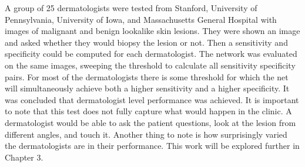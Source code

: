 A group of 25 dermatologists were tested from Stanford, University of Pennsylvania, University of Iowa, and Massachusetts General Hospital with images of malignant and benign lookalike skin lesions.  They were shown an image and asked whether they would biopsy the lesion or not.  Then a sensitivity and specificity could be computed for each dermatologist.  The network was evaluated on the same images, sweeping the threshold to calculate all sensitivity specificity pairs.  For most of the dermatologists there is some threshold for which the net will simultaneously achieve both a higher sensitivity and a higher specificity.  It was concluded that dermatologist level performance was achieved.  It is important to note that this test does not fully capture what would happen in the clinic.  A dermatologist would be able to ask the patient questions, look at the lesion from different angles, and touch it.  Another thing to note is how surprisingly varied the dermatologists are in their performance.  This work will be explored further in Chapter 3.


